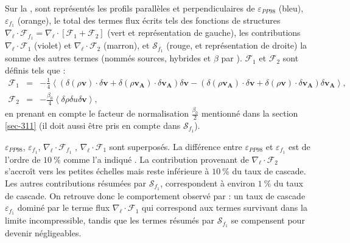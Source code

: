 % 
 Sur la , sont représentés les profils parallèles et perpendiculaires de $\varepsilon_{PP98}$ (bleu), $\varepsilon_{f_1}$ (orange), le total des termes flux écrits tels des fonctions de structures $\nabla_{\boldsymbol{\ell}} \cdot \mathcal{F}_{f_1} = \nabla_{\boldsymbol{\ell}} \cdot \left[\mathcal{F}_1 + \mathcal{F}_2\right] $ (vert et représentation  de gauche), les contributions $\nabla_{\boldsymbol{\ell}} \cdot \mathcal{F}_1$ (violet) et $\nabla_{\boldsymbol{\ell}} \cdot \mathcal{F}_2$ (marron), et $\mathcal{S}_{f_1}$ (rouge, et représentation  de droite) la somme des autres termes (nommés sources, hybrides et $\beta$ par ). $\mathcal{F}_1 $ et $ \mathcal{F}_2$ sont définis tels que :
 \begin{eqnarray}
     \mathcal{F}_1  &=& -\frac{1}{4} \left< \left(\delta \left(\rho\boldsymbol{v}\right) \cdot \delta \boldsymbol{v}+ \delta \left(\rho\boldsymbol{v_A}\right) \cdot \delta \boldsymbol{v_A} \right)\delta \boldsymbol{v}  -\left(\delta \left(\rho\boldsymbol{v_A}\right) \cdot \delta \boldsymbol{v}  + \delta \left(\rho\boldsymbol{v}\right) \cdot \delta \boldsymbol{v_A}  \right) \delta \boldsymbol{v_A} \right>, \qquad\\
     \mathcal{F}_2 &=& - \frac{\beta_0}{4} \left< \delta \rho \delta u \delta \boldsymbol{v}\right>,
 \end{eqnarray}
 en prenant en compte le facteur de normalisation $\frac{\beta_0}{2}$ mentionné dans la section \ref{sec-311} (il doit aussi être pris en compte dans $\mathcal{S}_{f_1}$). 
 
   $\varepsilon_{PP98}$, $\varepsilon_{f_1}$, $\nabla_{\boldsymbol{\ell}} \cdot \mathcal{F}_{f_1}$ ,  $\nabla_{\boldsymbol{\ell}} \cdot \mathcal{F}_1$  sont superposés. La différence entre  $\varepsilon_{PP98}$ et $\varepsilon_{f_1}$ est de l'ordre de $\SI{10}{\%}$ comme l'a indiqué \cite{ferrand_fluid_2021}. La contribution provenant de $\nabla_{\boldsymbol{\ell}} \cdot \mathcal{F}_2$ s'accroît vers les petites échelles mais reste inférieure à $\SI{10}{\%}$ du taux de cascade. Les autres contributions résumées par $\mathcal{S}_{f_1}$, correspondent à environ $\SI{1}{\%}$ du taux de cascade. %
On retrouve donc le comportement observé par  : un taux de cascade  $\varepsilon_{f_1}$ dominé par le terme flux $\nabla_{\boldsymbol{\ell}} \cdot \mathcal{F}_1$ qui correspond aux termes survivant dans la limite incompressible, tandis que les termes résumés par $\mathcal{S}_{f_1}$ se compensent pour devenir négligeables. 
% 
% 
